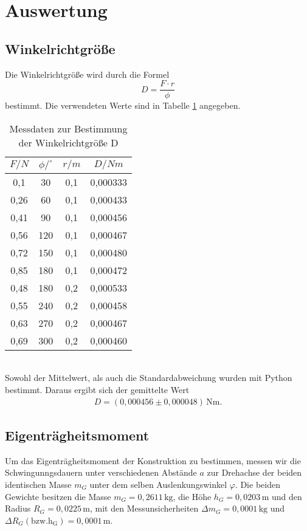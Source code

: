 \section{Auswertung}
\label{sec:Auswertung}

\subsection{Winkelrichtgröße}
\label{sec:Winkelrichtgroeße}
Die Winkelrichtgröße wird durch die Formel
\begin{equation}
  D = \frac{F \cdot r}{\phi}
\end{equation}
bestimmt. Die verwendeten Werte sind in Tabelle \ref{tab:winkelrichtgr} angegeben.
\begin{table}
  \centering
  \caption{Messdaten zur Bestimmung der Winkelrichtgröße D}
  \label{tab:winkelrichtgr}
  \begin{tabular}{c c c c}
    \toprule
    $F/N$ & $\phi /^{\circ}$ & $r/m$ & $D/Nm$ \\
    \midrule
    0,1  &  30 & 0,1 & 0,000333 \\
    0,26 &  60 & 0,1 & 0,000433 \\
    0,41 &  90 & 0,1 & 0,000456 \\
    0,56 & 120 & 0,1 & 0,000467 \\
    0,72 & 150 & 0,1 & 0,000480 \\
    0,85 & 180 & 0,1 & 0,000472 \\
    0,48 & 180 & 0,2 & 0,000533 \\
    0,55 & 240 & 0,2 & 0,000458 \\
    0,63 & 270 & 0,2 & 0,000467 \\
    0,69 & 300 & 0,2 & 0,000460 \\
    \bottomrule
  \end{tabular}
\end{table}
\\Sowohl der Mittelwert, als auch die Standardabweichung wurden mit Python bestimmt. Daraus ergibt sich der
gemittelte Wert
\begin{align*}
    D = (0{,}000456 \pm 0{,}000048)\,\mathrm{Nm} .
\end{align*}

\subsection{Eigenträgheitsmoment}
\label{sec:Eigentraegheitsmoment}
Um das Eigenträgheitsmoment der Konstruktion zu bestimmen, messen wir die Schwingunngsdauern unter verschiedenen Abstände $a$ zur Drehachse
der beiden identischen Masse $m_G$ unter dem selben Auslenkungswinkel $\varphi$.
Die beiden Gewichte besitzen die Masse $m_G = 0,2611\, \mathrm{kg}$, die Höhe $h_G = 0,0203\, \mathrm{m}$ und den Radius $R_G = 0,0225\, \mathrm{m}$, mit
den Messunsicherheiten $\Delta m_G = 0,0001\, \mathrm{kg}$ und $\Delta R_G\mathrm{(bzw. h_G)} = 0,0001\, \mathrm{m}$.

